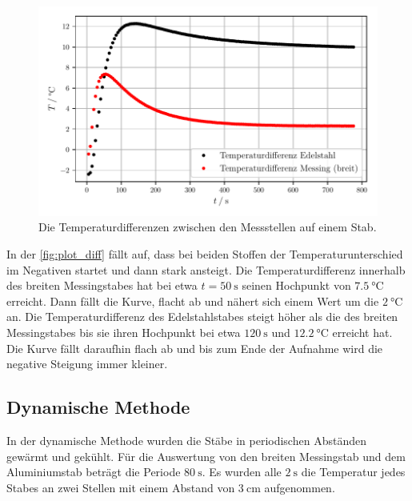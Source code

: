 \begin{figure}[H]
  \centering
  \includegraphics[width=\textwidth]{build/plot_diff.pdf}
  \caption{Die Temperaturdifferenzen zwischen den Messstellen auf einem Stab.}
  \label{fig:plot_diff}
\end{figure}
In der \autoref{fig:plot_diff} fällt auf, dass bei beiden Stoffen der Temperaturunterschied im Negativen startet und dann stark ansteigt.
Die Temperaturdifferenz innerhalb des breiten Messingstabes hat bei etwa $ t = \SI{50}{\second}$ seinen Hochpunkt von $\SI{7.5}{\celsius}$ erreicht.
Dann fällt die Kurve, flacht ab und nähert sich einem Wert um die $\SI{2}{\celsius}$ an.
Die Temperaturdifferenz des Edelstahlstabes steigt höher als die des breiten Messingstabes bis sie ihren Hochpunkt bei etwa $\SI{120}{\second} $ und $\SI{12.2}{\celsius}$ erreicht hat.
Die Kurve fällt daraufhin flach ab und bis zum Ende der Aufnahme wird die negative Steigung immer kleiner.

\subsection{Dynamische Methode}
In der dynamische Methode wurden die Stäbe in periodischen Abständen gewärmt und gekühlt. 
Für die Auswertung von den breiten Messingstab und dem Aluminiumstab beträgt die Periode $\SI{80}{\second}$.
Es wurden alle $\SI{2}{\second}$ die Temperatur jedes Stabes an zwei Stellen mit einem Abstand von $\SI{3}{\centi\metre}$ aufgenommen. 


